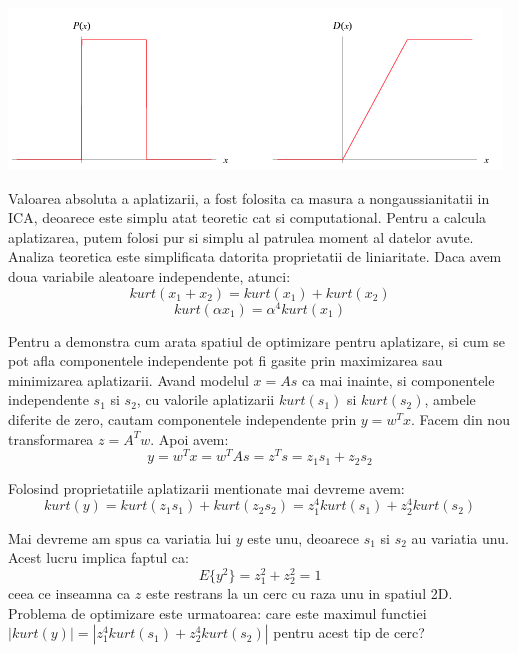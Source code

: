 \documentclass[12pt,oneside]{article}
\begin{document}
\begin{center}
	\includegraphics[scale=1.2]{uniform_distribution}
 \end{center}

Valoarea absoluta a aplatizarii, a fost folosita ca masura a nongaussianitatii in ICA, deoarece este simplu atat teoretic cat si computational. Pentru a calcula aplatizarea, putem folosi pur si simplu al patrulea moment al datelor avute. Analiza teoretica este simplificata datorita proprietatii de liniaritate. Daca avem doua variabile aleatoare independente, atunci:
\begin{equation}
kurt(x_1+x_2)=kurt(x_1)	+ kurt(x_2)
\end{equation}
\begin{equation}
kurt(\alpha x_1)=\alpha^4kurt(x_1)
\end{equation}

Pentru a demonstra cum arata spatiul de optimizare pentru aplatizare, si cum se pot afla componentele independente pot fi gasite prin maximizarea sau minimizarea aplatizarii. Avand modelul $x=As$ ca mai inainte, si componentele independente $s_1$ si $s_2$, cu valorile aplatizarii $kurt(s_1)$ si $kurt(s_2)$, ambele diferite de zero, cautam componentele independente prin $y=w^Tx$.
Facem din nou transformarea $z=A^Tw$. Apoi avem:
\begin{equation}
y=w^Tx=w^TAs=z^Ts=z_1s_1+z_2s_2
\end{equation}

Folosind proprietatiile aplatizarii mentionate mai devreme avem:
\begin{equation}
kurt(y)=kurt(z_1s_1)+kurt(z_2s_2)=z_1^4kurt(s_1)+z_2^4kurt(s_2)	
\end{equation}

Mai devreme am spus ca variatia lui $y$ este unu, deoarece $s_1$ si $s_2$ au variatia unu. Acest lucru implica faptul ca:
\begin{equation}
E\{y^2\}=z_1^2+z_2^2=1
\end{equation} 
ceea ce inseamna ca $z$ este restrans la un cerc cu raza unu in spatiul 2D. Problema de optimizare este urmatoarea: care este maximul functiei $|kurt(y)|=|z_1^4kurt(s_1)+z_2^4kurt(s_2)|$ pentru acest tip de cerc?
\end{document}
